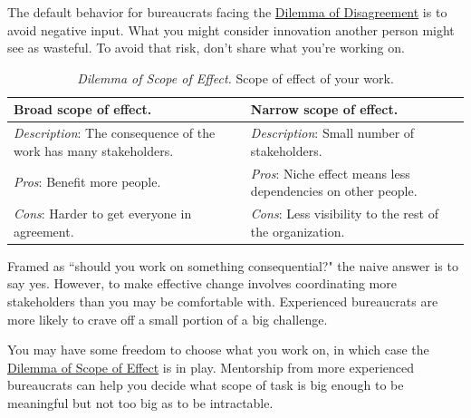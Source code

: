 %
The default behavior for bureaucrats facing the \hyperref[table:dilemma-personal-opposition-involve-ignore]{Dilemma of Disagreement} is to avoid negative input. What you might consider innovation another person might see as wasteful. To avoid that risk, don't share what you're working on.

\begin{center}
\begin{table}[H] %
\begin{tabular}{ | m{\dilemmatablewidth}| m{\dilemmatablewidth} | } 
  \hline
  \textbf{Broad scope of effect.} &
  \textbf{Narrow scope of effect.} \\
  \hline
  \textit{Description}: The consequence of the work has many stakeholders. &
  \textit{Description}: Small number of stakeholders. \\  
  \hline
  \textit{Pros}: Benefit more people. &
  \textit{Pros}: Niche effect means less dependencies on other people. \\
  \hline
  \textit{Cons}: Harder to get everyone in agreement. & 
  \textit{Cons}: Less visibility to the rest of the organization. \\
  \hline
\end{tabular}
\caption{
\textit{Dilemma of Scope of Effect.}
Scope of effect of your work. 
}
\label{table:dilemma-personal-scope-broad-vs-narrow}
\end{table}
\end{center}

Framed as ``should you work on something consequential?" the naive answer is to say yes. However, to make effective change involves coordinating more stakeholders than you may be comfortable with. Experienced bureaucrats are more likely to crave off a small portion of a big challenge.

You may have some freedom to choose what you work on, in which case the \hyperref[table:dilemma-personal-scope-broad-vs-narrow]{Dilemma of Scope of Effect} is in play. Mentorship from more experienced bureaucrats can help you decide what scope of task is big enough to be meaningful but not too big as to be intractable.

